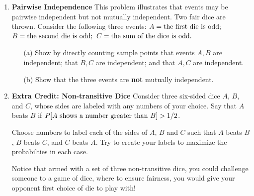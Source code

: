 \documentclass[11pt,fleqn]{article}
\begin{document}
\begin{enumerate}
\item{\bf Pairwise Independence}
This problem illustrates that events may be pairwise independent
but not mutually independent.
Two fair dice are thrown.  Consider the following three events:
$A=\hbox{\rm the first die is odd};$
$B=\hbox{\rm the second die is odd};$
$C=\hbox{\rm the sum of the dice is odd}.$
\begin{enumerate}
\item[(a)] Show by directly counting sample points
that events $A,B$ are independent; that $B,C$ are independent; and
that $A,C$ are independent.
\item[(b)] Show that the three events are {\bf not} mutually
independent.
\end{enumerate}

\item {\bf Extra Credit: Non-transitive Dice} 
Consider three six-sided dice $A$, $B$, and $C$, whose sides
are labeled with any numbers of your choice.
Say that $A$ beats $B$ if $P[A\hbox{ shows a number greater than } B] > 1/2$.

Choose numbers to label each of the sides of $A$, $B$ and $C$ such
that $A$ beats $B$, $B$ beats $C$, and $C$ beats $A$. Try to
create your labels to maximize the probabilties in each case.

Notice that armed with a set of three non-transitive dice, you could
challenge someone to a game of dice, where to ensure fairness, you
would give your opponent first choice of die to play with!



\end{enumerate}
\end{document}
